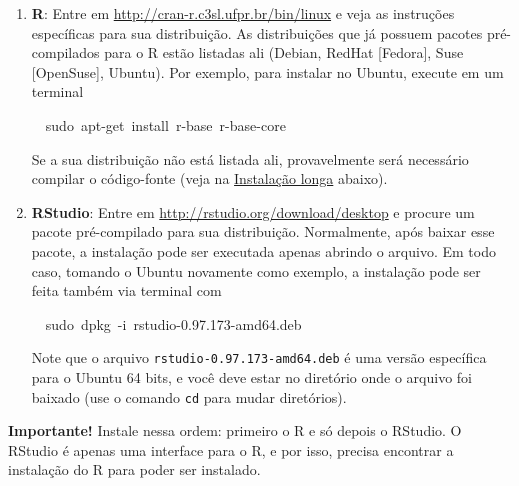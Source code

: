 \documentclass[a4paper,12pt]{article}\usepackage[]{graphicx}\usepackage[]{color}
\makeatletter
\newcommand{\hlnum}[1]{\textcolor[rgb]{0.686,0.059,0.569}{#1}}%
\newcommand{\hlopt}[1]{\textcolor[rgb]{0,0,0}{#1}}%
\newcommand{\hlstd}[1]{\textcolor[rgb]{0.345,0.345,0.345}{#1}}%
\newcommand{\hlkwc}[1]{\textcolor[rgb]{0.333,0.667,0.333}{#1}}%
\newenvironment{kframe}{%
 \def\at@end@of@kframe{}%
 \ifinner\ifhmode%
  \def\at@end@of@kframe{\end{minipage}}%
  \begin{minipage}{\columnwidth}%
 \fi\fi%
 \def\FrameCommand##1{\hskip\@totalleftmargin \hskip-\fboxsep
 \colorbox{shadecolor}{##1}\hskip-\fboxsep
     \hskip-\linewidth \hskip-\@totalleftmargin \hskip\columnwidth}%
 \MakeFramed {\advance\hsize-\width
   \@totalleftmargin\z@ \linewidth\hsize
   \@setminipage}}%
 {\par\unskip\endMakeFramed%
 \at@end@of@kframe}
\newenvironment{knitrout}{}{} %
\providecommand{\R}{\textsf{R}\xspace}
\providecommand{\RStudio}{\textsf{RStudio}\xspace}
\makeatother
\begin{document}
\begin{enumerate}
\item \textbf{\R}: Entre em \url{http://cran-r.c3sl.ufpr.br/bin/linux} e
  veja as instruções específicas para sua distribuição. As distribuições
  que já possuem pacotes pré-compilados para o \R estão listadas ali
  (Debian, RedHat [Fedora], Suse [OpenSuse], Ubuntu). Por exemplo, para
  instalar no Ubuntu, execute em um terminal
\begin{knitrout}\small
{}\color{fgcolor}\begin{kframe}
\noindent
\ttfamily
\hlstd{}\hlstd{\ \ }\hlstd{sudo\ apt}\hlopt{{-}}\hlstd{get\ }\hlkwc{install\ }\hlstd{r}\hlopt{{-}}\hlstd{base\ r}\hlopt{{-}}\hlstd{base}\hlopt{{-}}\hlstd{core}\hspace*{\fill}
\mbox{}
\normalfont
\normalsize
\end{kframe}
\end{knitrout}

  Se a sua distribuição não está listada ali, provavelmente será
  necessário compilar o código-fonte (veja na
  \hyperref[sec:ill]{Instalação longa} abaixo).
\item \textbf{\RStudio}: Entre em
  \url{http://rstudio.org/download/desktop} e procure um pacote
  pré-compilado para sua distribuição. Normalmente, após baixar esse
  pacote, a instalação pode ser executada apenas abrindo o arquivo. Em
  todo caso, tomando o Ubuntu novamente como exemplo, a instalação pode
  ser feita também via terminal com
\begin{knitrout}\small
{}\color{fgcolor}\begin{kframe}
\noindent
\ttfamily
\hlstd{}\hlstd{\ \ }\hlstd{sudo\ dpkg\ }\hlopt{{-}}\hlstd{i\ rstudio}\hlopt{{-}}\hlstd{}\hlnum{0.97.173}\hlstd{}\hlopt{{-}}\hlstd{amd64.deb}\hspace*{\fill}
\mbox{}
\normalfont
\normalsize
\end{kframe}
\end{knitrout}

  Note que o arquivo \texttt{rstudio-0.97.173-amd64.deb} é uma versão
  específica para o Ubuntu 64 bits, e você deve estar no diretório onde
  o arquivo foi baixado (use o comando \texttt{cd} para mudar
  diretórios).

\end{enumerate}

\textbf{Importante!} Instale nessa ordem: primeiro o \R e só depois o
\RStudio. O \RStudio é apenas uma interface para o \R, e por isso,
precisa encontrar a instalação do \R para poder ser instalado.
\end{document}
